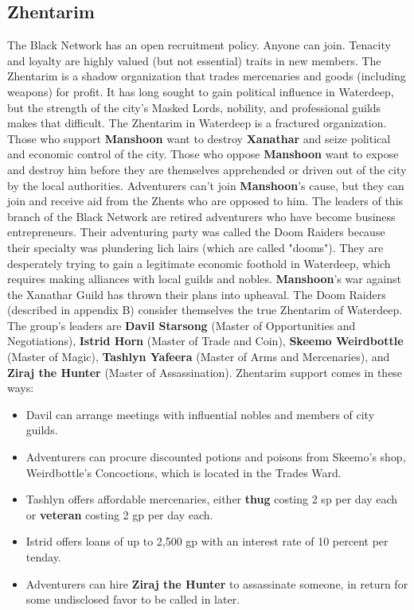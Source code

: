 \documentclass[10pt,a4paper,twoside,twocolumn,openany,nodeprecatedcode]{dndbook}
\begin{document}
\subsection{Zhentarim}
The Black Network has an open recruitment policy. Anyone can join. Tenacity and loyalty are highly valued (but not essential) traits in new members.
The Zhentarim is a shadow organization that trades mercenaries and goods (including weapons) for profit. It has long sought to gain political influence in Waterdeep, but the strength of the city's Masked Lords, nobility, and professional guilds makes that difficult.
The Zhentarim in Waterdeep is a fractured organization. Those who support \textbf{Manshoon} want to destroy \textbf{Xanathar} and seize political and economic control of the city. Those who oppose \textbf{Manshoon} want to expose and destroy him before they are themselves apprehended or driven out of the city by the local authorities.
Adventurers can't join \textbf{Manshoon}'s cause, but they can join and receive aid from the Zhents who are opposed to him. The leaders of this branch of the Black Network are retired adventurers who have become business entrepreneurs. Their adventuring party was called the Doom Raiders because their specialty was plundering lich lairs (which are called "dooms"). They are desperately trying to gain a legitimate economic foothold in Waterdeep, which requires making alliances with local guilds and nobles. \textbf{Manshoon}'s war against the Xanathar Guild has thrown their plans into upheaval.
The Doom Raiders (described in appendix B) consider themselves the true Zhentarim of Waterdeep. The group's leaders are \textbf{Davil Starsong} (Master of Opportunities and Negotiations), \textbf{Istrid Horn} (Master of Trade and Coin), \textbf{Skeemo Weirdbottle} (Master of Magic), \textbf{Tashlyn Yafeera} (Master of Arms and Mercenaries), and \textbf{Ziraj the Hunter} (Master of Assassination).
Zhentarim support comes in these ways:
\begin{itemize}

\item Davil can arrange meetings with influential nobles and members of city guilds.
\item Adventurers can procure discounted potions and poisons from Skeemo's shop, Weirdbottle's Concoctions, which is located in the Trades Ward.
\item Tashlyn offers affordable mercenaries, either \textbf{thug} costing 2 sp per day each or \textbf{veteran} costing 2 gp per day each.
\item Istrid offers loans of up to 2,500 gp with an interest rate of 10 percent per tenday.
\item Adventurers can hire \textbf{Ziraj the Hunter} to assassinate someone, in return for some undisclosed favor to be called in later.
\end{itemize}
\end{document}
